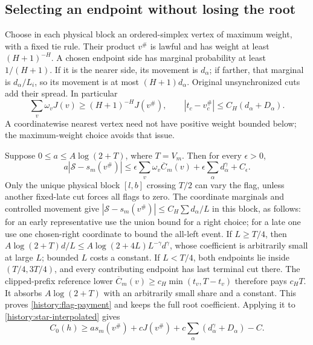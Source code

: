 \subsection{Selecting an endpoint without losing the root}

Choose in each physical block an ordered-simplex vertex of maximum
weight, with a fixed tie rule. Their product $v^\#$ is lawful and
has weight at least $(H+1)^{-H}$. A chosen endpoint side has marginal
probability at least $1/(H+1)$. If it is the nearer side, its movement
is $d_\alpha$; if farther, that marginal is $d_\alpha/L_i$, so
its movement is at most $(H+1)d_\alpha$. Original unsynchronized
cuts add their spread. In particular
\begin{equation}
 \sum_v\omega_vJ(v)\ge(H+1)^{-H}J(v^\#),\qquad
 |t_c-v_c^\#|\le C_H(d_\alpha+D_\alpha).
 \label{history:positive-vertex}
\end{equation}
A coordinatewise nearest vertex need not have positive weight bounded
below; the maximum-weight choice avoids that issue.

Suppose $0\le a\le A\log(2+T)$, where $T=V_m$. Then for every
$\epsilon>0$,
\begin{equation}
 a|\mathcal S-s_m(v^\#)|
 \le\epsilon\sum_v\omega_v\overline C_m(v)
                      +\epsilon\sum_\alpha d_\alpha^\gamma+C_\epsilon.
 \label{history:flag-payment}
\end{equation}
Only the unique physical block $[l,b]$ crossing $T/2$ can vary the
flag, unless another fixed-late cut forces all flags to zero. The
coordinate marginals and controlled movement give
$|\mathcal S-s_m(v^\#)|\le C_H\sum d_\alpha/L$ in this block,
as follows: for an early representative use the union bound
for a right choice; for a late one use one chosen-right coordinate to
bound the all-left event. If $L\ge T/4$, then
$A\log(2+T)d/L\le A\log(2+4L)L^{-\gamma}d^\gamma$,
whose coefficient is arbitrarily small at large $L$; bounded $L$
costs a constant. If $L<T/4$, both endpoints lie inside
$(T/4,3T/4)$, and every contributing endpoint has last terminal cut
there. The clipped-prefix reference lower
$\overline C_m(v)\ge c_H\min(t_v,T-t_v)$ therefore pays $c_HT$.
It absorbs $A\log(2+T)$ with an arbitrarily small share and a constant.
This proves \eqref{history:flag-payment} and keeps the full root
coefficient. Applying it to \eqref{history:star-interpolated} gives
\[
 C_0(h)\ge as_m(v^\#)+cJ(v^\#)
                     +c\sum_\alpha(d_\alpha^\gamma+D_\alpha)-C.
\]

